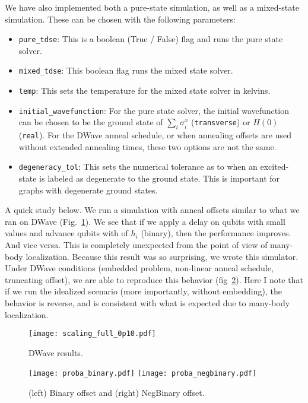 \documentclass[]{article}
\begin{document}
We have also implemented both a pure-state simulation, as well as a mixed-state simulation.
These can be chosen with the following parameters:

\begin{itemize}
	\item \texttt{pure\_tdse}: This is a boolean (True / False) flag and runs the pure state solver.
	\item \texttt{mixed\_tdse}: This boolean flag runs the mixed state solver.
	\item \texttt{temp}: This sets the temperature for the mixed state solver in kelvins.
	\item \texttt{initial\_wavefunction}: For the pure state solver, the initial wavefunction can be chosen to be the ground state of $\sum_i \sigma_i^x$ (\texttt{transverse}) or $H(0)$ (\texttt{real}). For the DWave anneal schedule, or when annealing offsets are used without extended annealing times, these two options are not the same.
	\item \texttt{degeneracy\_tol}: This sets the numerical tolerance as to when an excited-state is labeled as degenerate to the ground state. This is important for graphs with degenerate ground states.
\end{itemize}

A quick study below. We run a simulation with anneal offsets similar to what we ran on DWave (Fig.~\ref{fig:dwave_result}). We see that if we apply a delay on qubits with small values and advance qubits with of $h_i$ (binary), then the performance improves. And vice versa. This is completely unexpected from the point of view of many-body localization. Because this result was so surprising, we wrote this simulator. Under DWave conditions (embedded problem, non-linear anneal schedule, truncating offset), we are able to reproduce this behavior (fig~\ref{fig:proba_dwave}). Here I note that if we run the idealized scenario (more importantly, without embedding), the behavior is reverse, and is consistent with what is expected due to many-body localization.

\begin{figure}[htb]
	\centering
	\texttt{[image: scaling\_full\_0p10.pdf]}
	\caption{\label{fig:dwave_result} DWave results.
	}
\end{figure}


\begin{figure}[htb]
	\centering
	\texttt{[image: proba\_binary.pdf]}
	\texttt{[image: proba\_negbinary.pdf]}
	\caption{\label{fig:proba_dwave} (left) Binary offset and (right) NegBinary offset.
	}
\end{figure}
\end{document}
